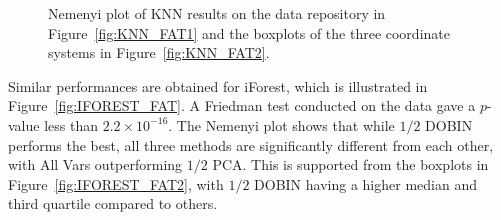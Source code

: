 \documentclass[a4paper,11pt]{article}
\begin{document}
\begin{figure}[!ht]
	\centering
	\hfill
	\caption{Nemenyi plot of KNN results on the data repository in Figure~\ref{fig:KNN_FAT1} and the boxplots of the three coordinate systems in Figure~\ref{fig:KNN_FAT2}.}
	\label{fig:KNN_FAT}
\end{figure}

Similar performances are obtained for iForest, which is illustrated in Figure~\ref{fig:IFOREST_FAT}. A Friedman test conducted on the data gave a $p$-value less than $2.2 \times 10^{-16}$. The Nemenyi plot shows that while $1/2$ DOBIN performs the best, all three methods are significantly different from each other, with All Vars outperforming $1/2$ PCA. This is supported from the boxplots in Figure~\ref{fig:IFOREST_FAT2}, with $1/2$ DOBIN having a higher median and third quartile compared to others. 

\end{document}
